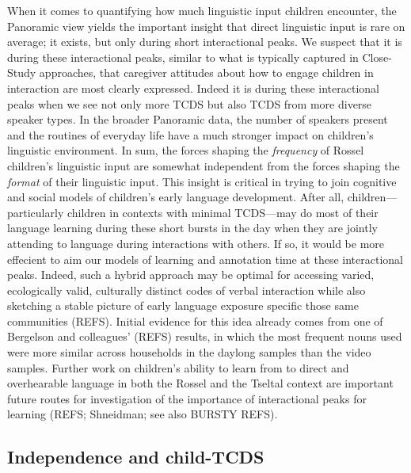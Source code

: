 \documentclass[,man,floatsintext]{apa6}
\begin{document}
When it comes to quantifying how much linguistic input children
encounter, the Panoramic view yields the important insight that direct
linguistic input is rare on average; it exists, but only during short
interactional peaks. We suspect that it is during these interactional
peaks, similar to what is typically captured in Close-Study approaches,
that caregiver attitudes about how to engage children in interaction are
most clearly expressed. Indeed it is during these interactional peaks
when we see not only more TCDS but also TCDS from more diverse speaker
types. In the broader Panoramic data, the number of speakers present and
the routines of everyday life have a much stronger impact on children's
linguistic environment. In sum, the forces shaping the \emph{frequency}
of Rossel children's linguistic input are somewhat independent from the
forces shaping the \emph{format} of their linguistic input. This insight
is critical in trying to join cognitive and social models of children's
early language development. After all, children---particularly children
in contexts with minimal TCDS---may do most of their language learning
during these short bursts in the day when they are jointly attending to
language during interactions with others. If so, it would be more
effecient to aim our models of learning and annotation time at these
interactional peaks. Indeed, such a hybrid approach may be optimal for
accessing varied, ecologically valid, culturally distinct codes of
verbal interaction while also sketching a stable picture of early
language exposure specific those same communities (REFS). Initial
evidence for this idea already comes from one of Bergelson and
colleagues' (REFS) results, in which the most frequent nouns used were
more similar across households in the daylong samples than the video
samples. Further work on children's ability to learn from to direct and
overhearable language in both the Rossel and the Tseltal context are
important future routes for investigation of the importance of
interactional peaks for learning (REFS; Shneidman; see also BURSTY
REFS).

\subsection{Independence and
child-TCDS}\label{independence-and-child-tcds}
\end{document}
